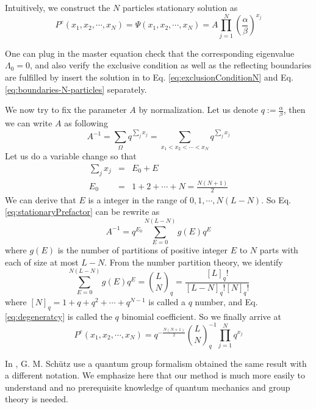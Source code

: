 \documentclass[12pt,a4paper]{article}
\begin{document}
Intuitively, we construct the $N$ particles stationary solution as
\begin{equation}
    \label{eq:stationaryN}
    P^e(x_1, x_2, \cdots, x_N) = \Psi(x_1, x_2, \cdots, x_N) =  A
    \prod_{j=1}^N\left(\frac{\alpha}{\beta}\right)^{x_j}
\end{equation}

One can plug in the master equation check that the corresponding eigenvalue
$\Lambda_0= 0$, and also verify the exclusive condition as well as the reflecting
boundaries are fulfilled by insert the solution in to Eq.
\eqref{eq:exclusionConditionN} and Eq. \eqref{eq:boundaries-N-particles}
separately.

We now try to fix the parameter $A$ by normalization. Let us denote
$q:=\frac{\alpha}{\beta}$, then we can write $A$ as following
\begin{equation}
    \label{eq:stationaryPrefactor}
    A^{-1} = \sum_{\Omega} q^{\sum_j{x_j}} = 
    \sum_{x_1 < x_2 < \cdots < x_N} q^{\sum_j{x_j}}
\end{equation}
Let us do a variable change so that 
\begin{eqnarray*}
    \sum_j{x_j} &=& E_0 + E \\
    E_0 &=& 1 + 2 + \cdots + N = \frac{N(N+1)}{2}
\end{eqnarray*}
We can derive that $E$ is a integer in the range of $0, 1, \cdots, N(L-N)$. So
Eq. \eqref{eq:stationaryPrefactor} can be rewrite as 
\begin{equation}
    \label{eq:prefactorRewrite}
    A^{-1} = q^{E_0}\sum_{E=0}^{N(L-N)}g(E)q^E
\end{equation}
where $g(E)$ is the number of partitions of positive integer $E$ to $N$ parts
with each of size at most $L-N$. From the number partition theory, we identify
\begin{equation}
    \label{eq:degeneratcy}
    \sum_{E=0}^{N(L-N)}g(E)q^E = \binom{L}{N}_q =
    \frac{[L]_q!}{[L-N]_q![N]_q!}
\end{equation}
where $[N]_q = 1 + q + q^2 + \cdots + q^{N-1}$ is called a $q$ number, and Eq.
\eqref{eq:degeneratcy} is called the $q$ binomial coefficient\cite{}.
So we finally arrive at 
\begin{equation}
    \label{eq:stationarySolutionN}
    P^e(x_1, x_2, \cdots, x_N) = q^{-\frac{N(N+1)}{2}}
    \binom{L}{N}_q^{-1}\prod_{j=1}^N{q^{x_j}}
\end{equation}

In \cite{}, G. M. Sch\"{u}tz use a quantum group formalism obtained the same
result with a different notation. We emphasize here that our method is much more
easily to understand and no prerequisite knowledge of quantum mechanics and
group theory is needed.
\end{document}

